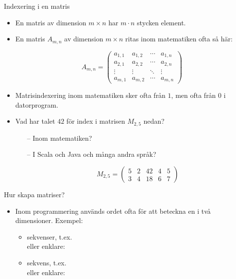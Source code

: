 \begin{Slide}{Indexering i en matris}\SlideFontSmall
\begin{itemize}

  \item En matris av dimension $m\times{}n$ har $m \cdot n$ stycken element.

  \item En matris $A_{m,n}$ av dimension $m\times{}n$ ritas inom matematiken ofta så här:

  \[
  A_{m,n} =
   \begin{pmatrix}
    a_{1,1} & a_{1,2} & \cdots & a_{1,n} \\
    a_{2,1} & a_{2,2} & \cdots & a_{2,n} \\
    \vdots  & \vdots  & \ddots & \vdots  \\
    a_{m,1} & a_{m,2} & \cdots & a_{m,n}
   \end{pmatrix}
  \]


\item Matrisindexering inom matematiken sker ofta från $1$, men ofta från $0$ i datorprogram.

\item Vad har talet $42$ för index i matrisen $M_{2,5}$ nedan?
\begin{itemize}\SlideFontTiny
  \item[--] Inom matematiken?
  \item[--] I Scala och Java och många andra språk?

  \[
  M_{2,5}=
    \begin{pmatrix}
      5 & 2 & 42 & 4 & 5 \\
      3 & 4 & 18 & 6 & 7
    \end{pmatrix}
  \]
\end{itemize}
\end{itemize}
\end{Slide}

\begin{Slide}{Hur skapa matriser?}
  \setlength{\leftmargini}{0pt}

  \begin{itemize}
  \item Inom programmering används ordet  ofta för att beteckna en  i två dimensioner. Exempel:
  \begin{itemize}
   \item {} sekvenser, t.ex.  \\
    eller enklare: \\

    \item {} sekvens, t.ex.  \\
     eller enklare: \\

  \end{itemize}

\end{itemize}
\end{Slide}


